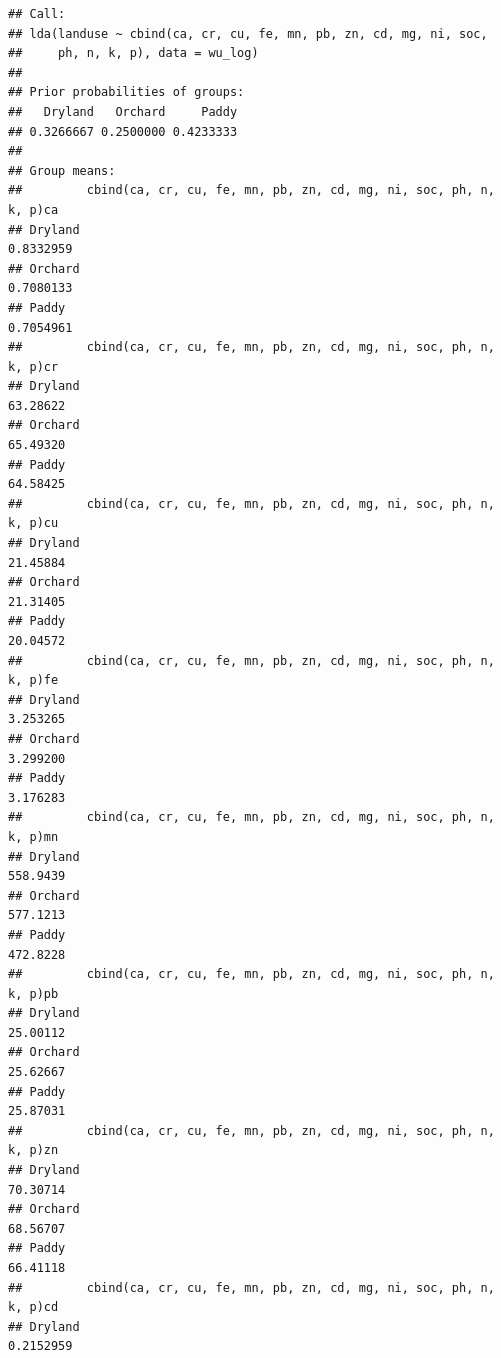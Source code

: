 \documentclass[
]{article}
\begin{document}
\begin{verbatim}
## Call:
## lda(landuse ~ cbind(ca, cr, cu, fe, mn, pb, zn, cd, mg, ni, soc, 
##     ph, n, k, p), data = wu_log)
## 
## Prior probabilities of groups:
##   Dryland   Orchard     Paddy 
## 0.3266667 0.2500000 0.4233333 
## 
## Group means:
##         cbind(ca, cr, cu, fe, mn, pb, zn, cd, mg, ni, soc, ph, n, k, p)ca
## Dryland                                                         0.8332959
## Orchard                                                         0.7080133
## Paddy                                                           0.7054961
##         cbind(ca, cr, cu, fe, mn, pb, zn, cd, mg, ni, soc, ph, n, k, p)cr
## Dryland                                                          63.28622
## Orchard                                                          65.49320
## Paddy                                                            64.58425
##         cbind(ca, cr, cu, fe, mn, pb, zn, cd, mg, ni, soc, ph, n, k, p)cu
## Dryland                                                          21.45884
## Orchard                                                          21.31405
## Paddy                                                            20.04572
##         cbind(ca, cr, cu, fe, mn, pb, zn, cd, mg, ni, soc, ph, n, k, p)fe
## Dryland                                                          3.253265
## Orchard                                                          3.299200
## Paddy                                                            3.176283
##         cbind(ca, cr, cu, fe, mn, pb, zn, cd, mg, ni, soc, ph, n, k, p)mn
## Dryland                                                          558.9439
## Orchard                                                          577.1213
## Paddy                                                            472.8228
##         cbind(ca, cr, cu, fe, mn, pb, zn, cd, mg, ni, soc, ph, n, k, p)pb
## Dryland                                                          25.00112
## Orchard                                                          25.62667
## Paddy                                                            25.87031
##         cbind(ca, cr, cu, fe, mn, pb, zn, cd, mg, ni, soc, ph, n, k, p)zn
## Dryland                                                          70.30714
## Orchard                                                          68.56707
## Paddy                                                            66.41118
##         cbind(ca, cr, cu, fe, mn, pb, zn, cd, mg, ni, soc, ph, n, k, p)cd
## Dryland                                                         0.2152959

\end{verbatim}
\end{document}
